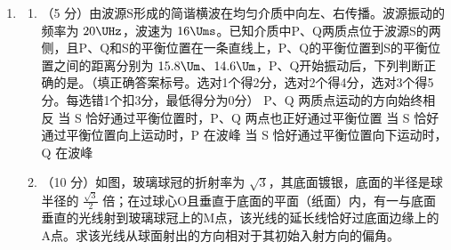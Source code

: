 \documentclass[\gkver]{gaokaozhenti}
\begin{document}
\begin{enumerate}
{根据题意可得 $p_{2}'=p_{1}'$，$l_{2}'=4.00\Ucm+\frac{20.0-5.00}{2}\Ucm-h$，

根据玻意耳定律得 $p_{2}l_{2}=p_{2}'l_{2}'$，解得 $h=9.42\Ucm$。
}

\item
\begin{enumerate}
	\item
	（5 分）由波源S形成的简谐横波在均匀介质中向左、右传播。波源振动的频率为 $20\UHz$，波速为 $16\Ums$。已知介质中P、Q两质点位于波源S的两侧，且P、Q和S的平衡位置在一条直线上，P、Q的平衡位置到S的平衡位置之间的距离分别为 $15.8\Um$、$14.6\Um$，P、Q开始振动后，下列判断正确的是。（填正确答案标号。选对1个得2分，选对2个得4分，选对3个得5分。每选错1个扣3分，最低得分为0分）
	{P、Q 两质点运动的方向始终相反}
	{当 S 恰好通过平衡位置时，P、Q 两点也正好通过平衡位置}
	{当 S 恰好通过平衡位置向上运动时，P 在波峰}
	{当 S 恰好通过平衡位置向下运动时，Q 在波峰}
	\item
	（10 分）如图，玻璃球冠的折射率为 $\sqrt{3}$，其底面镀银，底面的半径是球半径的 $\frac{\sqrt{3}}{2}$ 倍；在过球心O且垂直于底面的平面（纸面）内，有一与底面垂直的光线射到玻璃球冠上的M点，该光线的延长线恰好过底面边缘上的A点。求该光线从球面射出的方向相对于其初始入射方向的偏角。
\end{enumerate}



\end{enumerate}
\end{document}
